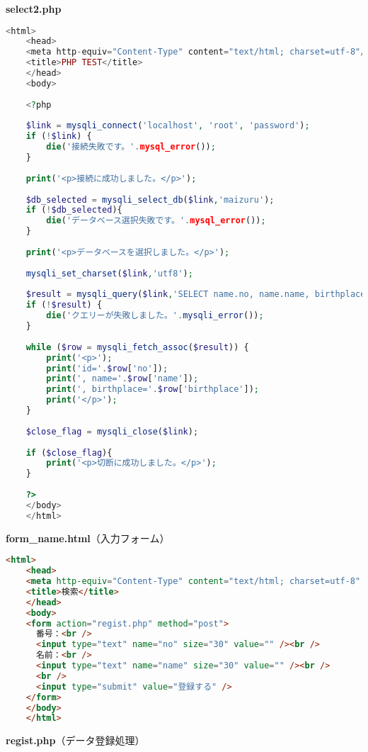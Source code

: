 \textbf{select2.php}
\begin{lstlisting}[language=php]
    <html>
    <head>
    <meta http-equiv="Content-Type" content="text/html; charset=utf-8"/>
    <title>PHP TEST</title>
    </head>
    <body>
    
    <?php
    
    $link = mysqli_connect('localhost', 'root', 'password');
    if (!$link) {
        die('接続失敗です。'.mysql_error());
    }
    
    print('<p>接続に成功しました。</p>');
    
    $db_selected = mysqli_select_db($link,'maizuru');
    if (!$db_selected){
        die('データベース選択失敗です。'.mysql_error());
    }
    
    print('<p>データベースを選択しました。</p>');
    
    mysqli_set_charset($link,'utf8');
    
    $result = mysqli_query($link,'SELECT name.no, name.name, birthplace.birthplace FROM name inner join birthplace on name.name=birthplace.name');
    if (!$result) {
        die('クエリーが失敗しました。'.mysqli_error());
    }
    
    while ($row = mysqli_fetch_assoc($result)) {
        print('<p>');
        print('id='.$row['no']);
        print(', name='.$row['name']);
        print(', birthplace='.$row['birthplace']);
        print('</p>');
    }
    
    $close_flag = mysqli_close($link);
    
    if ($close_flag){
        print('<p>切断に成功しました。</p>');
    }
    
    ?>
    </body>
    </html>
\end{lstlisting}

\textbf{form\_name.html}（入力フォーム）

\begin{lstlisting}[language=html]
    <html>
    <head>
    <meta http-equiv="Content-Type" content="text/html; charset=utf-8" />
    <title>検索</title>
    </head>
    <body>
    <form action="regist.php" method="post">
      番号：<br />
      <input type="text" name="no" size="30" value="" /><br />
      名前：<br />
      <input type="text" name="name" size="30" value="" /><br />
      <br />
      <input type="submit" value="登録する" />
    </form>
    </body>
    </html>
\end{lstlisting}

\textbf{regist.php}（データ登録処理）


